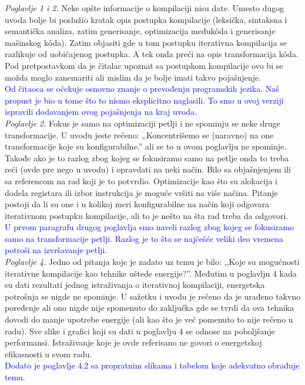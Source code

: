 \documentclass[a4paper]{report}
\newcommand{\odgovor}[1]{\textcolor{blue}{#1}}
\begin{document}
\textit{Poglavlje 1 i 2.} Neke opšte informacije o kompilaciji nisu date. Umesto dugog uvoda bolje bi poslužio kratak opis postupka kompilacije (leksička, sintaksna i semantička analiza, zatim generisanje, optimizacija međukôda i generisanje mašinskog kôda). Zatim objasiti gde u tom postupku iterativna kompilacija se razlikuje od uobičajenog postupka. A tek onda preći na opis transformacija kôda. Pod pretpostavkom da je čitalac upoznat sa postupkom kompilacije ovo bi se možda moglo zanemariti ali mislim da je bolje imati takvo pojašnjenje. \\
\odgovor{ Od čitaoca se očekuje osnovno znanje o prevođenju programskih jezika. Naš propust je bio u tome što to nismo eksplicitno naglasili. To smo u ovoj verziji ispravili dodavanjem ovog pojašnjenja na kraj uvoda. }
\\

\textit{Poglavlje 2.} Fokus je samo na optimizaciji petlji i ne spominju se neke druge transformacije. U uvodu jeste rečeno: ,,Koncentrišemo se (naravno) na one transformacije koje su konfigurabilne.'' ali se to u ovom poglavlju ne spominje. Takođe ako je to razlog zbog kojeg se fokusiramo samo na petlje onda to treba reći (ovde pre nego u uvodu) i opravdati na neki način. Bilo sa objašnjenjem ili sa referencom na rad koji je to potvrdio. Optimizacije kao što su alokacija i dodela registara ili izbor instrukcija je moguće vršiti na više načina. Pitanje postoji da li su one i u kolikoj meri konfigurabilne na način koji odgovara iterativnom postupku kompilacije, ali to je nešto na šta rad treba da odgovori. \\
\odgovor{ U prvom paragrafu drugog poglavlja smo naveli razlog zbog kojeg se fokusiramo samo na transformacije petlji. Razlog je to
		  što se najčešće veliki deo vremena potroši na izvršavanje petlji. }
\\

\textit{Poglavlje 4.} Jedno od pitanja koje je zadato uz temu je bilo: ,,Koje su mogućnosti iterativne kompilacije kao tehnike uštede energije?''. Međutim u poglavlju 4 kada su dati rezultati jednog istraživanja o iterativnoj kompilaciji, energetska potrošnja se nigde ne spominje. U sažetku i uvodu je rečeno da je urađeno takvno poređenje ali ono nigde nije spomenuto do zaključka gde se tvrdi da ova tehnika dovodi do manje upotrebe energije (ali kao što je već pomenuto to nije rečeno u radu). Sve slike i grafici koji su dati u poglavlju 4 se odnose na poboljšanje performansi. Istraživanje koje je ovde referisano ne govori o energetskoj efikasnosti u svom radu. \\
\odgovor { Dodato je poglavlje 4.2 sa propratnim slikama i tabelom koje adekvatno obrađuje temu. }
\end{document}
